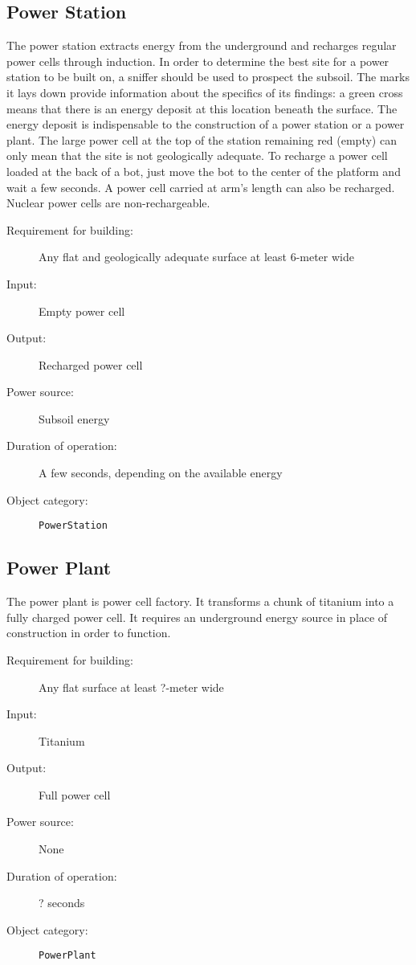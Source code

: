 \subsection{Power Station}

The power station extracts energy from the underground and recharges regular power cells through induction. In order to determine the best site for a power station to be built on, a sniffer should be used to prospect the subsoil. The marks it lays down provide information about the specifics of its findings: a green cross means that there is an energy deposit at this location beneath the surface. The energy deposit is indispensable to the construction of a power station or a power plant. The large power cell at the top of the station remaining red (empty) can only mean that the site is not geologically adequate. To recharge a power cell loaded at the back of a bot, just move the bot to the center of the platform and wait a few seconds. A power cell carried at arm's length can also be recharged. Nuclear power cells are non-rechargeable.

\begin{description}
    \item[Requirement for building:] Any flat and geologically adequate surface at least 6-meter wide
    \item[Input:] Empty power cell
    \item[Output:] Recharged power cell
    \item[Power source:] Subsoil energy
    \item[Duration of operation:] A few seconds, depending on the available energy
    \item[Object category:] \texttt{PowerStation}
\end{description}


\subsection{Power Plant}


The power plant is power cell factory. It transforms a chunk of titanium into a fully charged power cell. It requires an underground energy source in place of construction in order to function.

\begin{description}
    \item[Requirement for building:] Any flat surface at least ?-meter wide
    \item[Input:] Titanium
    \item[Output:] Full power cell
    \item[Power source:] None
    \item[Duration of operation:] ? seconds
    \item[Object category:] \texttt{PowerPlant}
\end{description}


